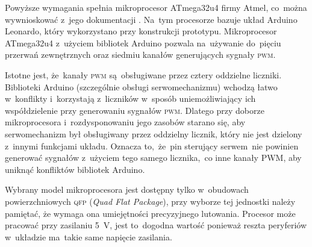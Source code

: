 \documentclass[11pt]{article}
\begin{document}
Powyższe wymagania spełnia mikroprocesor ATmega32u4 firmy Atmel, co~można wywnioskować z~jego dokumentacji \cite{atmega32u4_datasheet}.
Na~tym procesorze bazuje układ Arduino Leonardo, który wykorzystano przy konstrukcji prototypu.
Mikroprocesor ATmega32u4 z~użyciem bibliotek Arduino pozwala na~używanie do~pięciu przerwań zewnętrznych oraz siedmiu kanałów generujących sygnały \textsc{pwm}.

Istotne jest, że~kanały \textsc{pwm} są~obsługiwane przez cztery oddzielne liczniki. Biblioteki Arduino (szczególnie obsługi serwomechanizmu) wchodzą łatwo w~konflikty i~korzystają z~liczników w~sposób uniemożliwiający ich współdzielenie przy generowaniu sygnałów \textsc{pwm}.
Dlatego przy doborze mikroprocesora i~rozdysponowaniu jego zasobów starano się, aby serwomechanizm był obsługiwany przez oddzielny licznik, który nie jest dzielony z~innymi funkcjami układu.
Oznacza to,~że~pin sterujący serwem~nie powinien generować sygnałów z~użyciem tego samego licznika,~co inne kanały PWM, aby uniknąć konfliktów bibliotek Arduino.

Wybrany model mikroprocesora jest dostępny tylko w~obudowach powierzchniowych \textsc{qfp} (\textit{Quad Flat Package}), przy wyborze tej jednostki należy pamiętać, że wymaga ona umiejętności precyzyjnego lutowania. Procesor może pracować przy zasilaniu 5~\si{\volt}, jest to~dogodna wartość ponieważ reszta peryferiów w~układzie ma~takie same napięcie zasilania.
\end{document}

